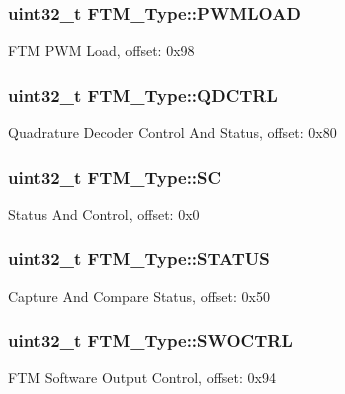 \subsubsection[{\texorpdfstring{P\+W\+M\+L\+O\+AD}{PWMLOAD}}]{ uint32\+\_\+t F\+T\+M\+\_\+\+Type\+::\+P\+W\+M\+L\+O\+AD}\hypertarget{structFTM__Type_a28478e01da54c088007371f44451b2d7}{}\label{structFTM__Type_a28478e01da54c088007371f44451b2d7}
F\+TM P\+WM Load, offset\+: 0x98 
\subsubsection[{\texorpdfstring{Q\+D\+C\+T\+RL}{QDCTRL}}]{ uint32\+\_\+t F\+T\+M\+\_\+\+Type\+::\+Q\+D\+C\+T\+RL}\hypertarget{structFTM__Type_a0a07f1a16c3d7714947e8ad3fb070592}{}\label{structFTM__Type_a0a07f1a16c3d7714947e8ad3fb070592}
Quadrature Decoder Control And Status, offset\+: 0x80 
\subsubsection[{\texorpdfstring{SC}{SC}}]{ uint32\+\_\+t F\+T\+M\+\_\+\+Type\+::\+SC}\hypertarget{structFTM__Type_a539e171615dd7eccfd0c9c4f78c895ab}{}\label{structFTM__Type_a539e171615dd7eccfd0c9c4f78c895ab}
Status And Control, offset\+: 0x0 
\subsubsection[{\texorpdfstring{S\+T\+A\+T\+US}{STATUS}}]{ uint32\+\_\+t F\+T\+M\+\_\+\+Type\+::\+S\+T\+A\+T\+US}\hypertarget{structFTM__Type_aa89cff385d101610ed0d60e0a0b50c6c}{}\label{structFTM__Type_aa89cff385d101610ed0d60e0a0b50c6c}
Capture And Compare Status, offset\+: 0x50 
\subsubsection[{\texorpdfstring{S\+W\+O\+C\+T\+RL}{SWOCTRL}}]{ uint32\+\_\+t F\+T\+M\+\_\+\+Type\+::\+S\+W\+O\+C\+T\+RL}\hypertarget{structFTM__Type_ab45e3f92a7675c23c0ee9227f2a198af}{}\label{structFTM__Type_ab45e3f92a7675c23c0ee9227f2a198af}
F\+TM Software Output Control, offset\+: 0x94 
